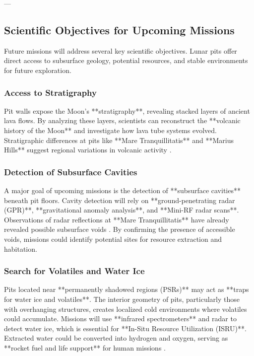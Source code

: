 ---

\subsection{Scientific Objectives for Upcoming Missions}

Future missions will address several key scientific objectives. Lunar pits offer direct access to subsurface geology, potential resources, and stable environments for future exploration.

\subsubsection{Access to Stratigraphy}

Pit walls expose the Moon's **stratigraphy**, revealing stacked layers of ancient lava flows. By analyzing these layers, scientists can reconstruct the **volcanic history of the Moon** and investigate how lava tube systems evolved. Stratigraphic differences at pits like **Mare Tranquillitatis** and **Marius Hills** suggest regional variations in volcanic activity \cite{new-wagner}.

\subsubsection{Detection of Subsurface Cavities}

A major goal of upcoming missions is the detection of **subsurface cavities** beneath pit floors. Cavity detection will rely on **ground-penetrating radar (GPR)**, **gravitational anomaly analysis**, and **Mini-RF radar scans**. Observations of radar reflections at **Mare Tranquillitatis** have already revealed possible subsurface voids \cite{Carrer2024}. By confirming the presence of accessible voids, missions could identify potential sites for resource extraction and habitation.

\subsubsection{Search for Volatiles and Water Ice}

Pits located near **permanently shadowed regions (PSRs)** may act as **traps for water ice and volatiles**. The interior geometry of pits, particularly those with overhanging structures, creates localized cold environments where volatiles could accumulate. Missions will use **infrared spectrometers** and radar to detect water ice, which is essential for **In-Situ Resource Utilization (ISRU)**. Extracted water could be converted into hydrogen and oxygen, serving as **rocket fuel and life support** for human missions \cite{jsanders-isru}.

